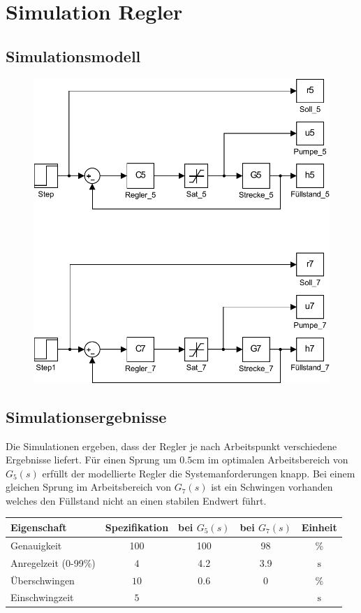 \section{Simulation Regler}

\subsection{Simulationsmodell}

\begin{figure}[h!]
	\centering
	\includegraphics[scale=0.8]{11/model.pdf}
\end{figure}

\subsection{Simulationsergebnisse}
Die Simulationen ergeben, dass der Regler je nach Arbeitspunkt verschiedene
Ergebnisse liefert. Für einen Sprung um $0.5\si{\centi\meter}$ im optimalen
Arbeitsbereich von $G_5(s)$ erfüllt der modellierte Regler die
Systemanforderungen knapp. Bei einem gleichen Sprung im Arbeitsbereich
von $G_7(s)$ ist ein Schwingen vorhanden welches den Füllstand nicht
an einen stabilen Endwert führt.

\begin{table}[h!]
	\centering
	\begin{tabular}{l c c c c}
		Eigenschaft
			& Spezifikation
			& bei $G_5(s)$
			& bei $G_7(s)$
			& Einheit \\
		\hline
		Genauigkeit
			& 100
			& 100
			& 98 
			& \% \\
		Anregelzeit (0-99\%)
			& $4$
			& 4.2
			& 3.9
			& $\si{\second}$ \\
		Überschwingen
			& $10$
			& 0.6
			& 0
			& \% \\
		Einschwingzeit
			& $5$
			& 
			&
			& $\si{\second}$ \\
	\end{tabular}
\end{table}

